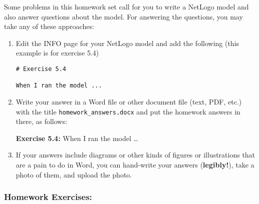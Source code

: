 \documentclass[
]{article}
\begin{document}
Some problems in this homework set call for you to write a NetLogo model
and also answer questions about the model. For answering the questions,
you may take any of these approaches:

\begin{enumerate}
\def\labelenumi{\arabic{enumi}.}
\item
  Edit the INFO page for your NetLogo model and add the following (this
  example is for exercise 5.4)

\begin{verbatim}
# Exercise 5.4

When I ran the model ...
\end{verbatim}
\item
  Write your answer in a Word file or other document file (text, PDF,
  etc.) with the title \texttt{homework\_answers.docx} and put the
  homework answers in there, as follows:

  \textbf{Exercise 5.4:} When I ran the model \ldots{}
\item
  If your answers include diagrams or other kinds of figures or
  illustrations that are a pain to do in Word, you can hand-write your
  answers (\textbf{legibly!}), take a photo of them, and upload the
  photo.
\end{enumerate}

\subsubsection{Homework Exercises:}\label{homework-exercises-4}
\end{document}
